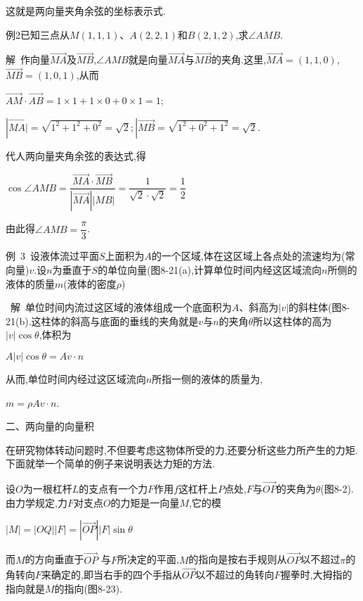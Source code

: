 \documentclass[oneside]{book}
\begin{document}
这就是两向量夹角余弦的坐标表示式.

例2已知三点从$M(1,1,1)$、$A(2,2,1)$和$B(2,1,2)$,求$\angle AMB$.

解~作向量$\overrightarrow {MA} $及$\overrightarrow {MB} $,$\angle AMB$就是向量$\overrightarrow {MA} $与$\overrightarrow {MB} $的夹角.这里,$\overrightarrow {MA}  = \left( {1,1,0} \right)$,$\overrightarrow {MB}  = (1,0,1)$,从而

$\overrightarrow {AM}  \cdot \overrightarrow {AB}  = 1 \times 1 + 1 \times 0 + 0 \times 1 = 1$;

$|\overrightarrow {MA|}  = \sqrt {{1^2} + {1^2} + {0^2}}  = \sqrt 2 ;|\overrightarrow {MB}  = \sqrt {{1^2} + {0^2} + {1^2}}  = \sqrt 2 $.

代人两向量夹角余弦的表达式,得

$\cos \angle AMB = \dfrac{{\overrightarrow {MA}  \cdot \overrightarrow {MB} }}{{|\overrightarrow {MA} ||MB|}} = \dfrac{1}{{\sqrt 2  \cdot \sqrt 2 }} = \dfrac{1}{2}$

由此得$\angle AMB = \dfrac{\pi }{3}$.

例~3~设液体流过平面$S$上面积为$A$的一个区域,体在这区域上各点处的流速均为(常向量)$v$.设$n$为垂直于$S$的单位向量(图8-21(a),计算单位时间内经这区域流向$n$所侧的液体的质量$m$(液体的密度$\rho $)

~解~单位时间内流过这区域的液体组成一个底面积为$A$、斜高为$|v|$的斜柱体(图8-21(b).这柱体的斜高与底面的垂线的夹角就是$v$与$n$的夹角$\theta $所以这柱体的高为$|v|{{\cos}}\theta $,体积为

$A|v|{{\cos}}\theta  = Av \cdot n$

从而,单位时间内经过这区域流向$n$所指一侧的液体的质量为, 

$m = \rho Av \cdot n$.

二、两向量的向量积

在研究物体转动问题时,不但要考虑这物体所受的力,还要分析这些力所产生的力矩.下面就举一个简单的例子来说明表达力矩的方法.

设$O$为一根杠杆$L$的支点有一个力$F$作用$f$这杠杆上$P$点处,$F$与$\overrightarrow {OP} $的夹角为$\theta $(图8-2).由力学规定,力$F$对支点$O$的力矩是一向量$M$,它的模

$\left| M \right| = \left| {OQ} \right|\left| F \right| = \left| {\overrightarrow {OP} } \right|\left| F \right|{{\sin}}\theta $

而$M$的方向垂直于$\overrightarrow {OP} $
与$F$所决定的平面,$M$的指向是按右手规则从$\overrightarrow {OP} $以不超过$\pi $的角转向$F$来确定的,即当右手的四个手指从$\overrightarrow {OP} $以不超过的角转向$F$握拳时,大拇指的指向就是$M$的指向(图8-23).
\end{document}
